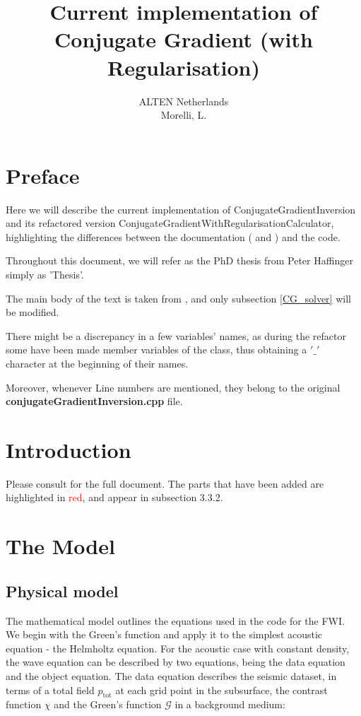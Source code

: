 \documentclass[10pt,a4paper]{article}
\title{Current implementation of Conjugate Gradient (with Regularisation)}
\author{ALTEN Netherlands\\
Morelli, L.}
\begin{document}
\maketitle
\newpage
\tableofcontents
\newpage

\clearpage
\section{Preface}
Here we will describe the current implementation of ConjugateGradientInversion and its refactored version ConjugateGradientWithRegularisationCalculator, highlighting the differences between the documentation ( \texttt{} and \newline \texttt{} ) and the code.

Throughout this document, we will refer as the PhD thesis from Peter Haffinger simply as 'Thesis'.

The main body of the text is taken from \texttt{}, and only subsection \ref{CG_solver} will be modified.

There might be a discrepancy in a few variables' names, as during the refactor some have been made member variables of the class, thus obtaining a $'\_'$ character at the beginning of their names.

Moreover, whenever Line numbers are mentioned, they belong to the original \textbf{conjugateGradientInversion.cpp} file.

\section{Introduction}
Please consult  \texttt{} for the full document. 
The parts that have been added are highlighted in \textcolor{red}{red}, and appear in subsection 3.3.2.

\section{The Model}
\subsection{Physical model}

The mathematical model outlines the equations used in the code for the FWI.
We begin with the Green's function and apply it to the
simplest acoustic equation - the Helmholtz equation.
For the acoustic case with constant density, the wave equation can be
described by two equations,
being the data equation and the object equation. The data equation
describes the seismic dataset, in terms of a total field
$p_{\text{tot}}$ at each grid point in the subsurface, the contrast
function $\chi$ and the Green's function $\mathcal{G}$
in a background medium: 
\end{document}
